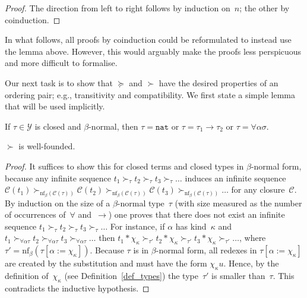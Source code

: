 \documentclass[a4paper,UKenglish,cleveref,autoref,numberwithinsect]{lipics-v2019}
\theoremstyle{definition}
\newcommand{\ITypes}{\mathcal{Y}}
\newcommand{\arrtype}{\rightarrow}
\newcommand{\tapp}[2]{#1 * #2}
\newcommand{\subst}[2]{#1:=#2}
\newcommand{\nat}{\mathtt{nat}}
\newcommand{\cl}{\mathcal{C}}
\newcommand{\nf}{\mathrm{nf}}
\begin{document}
\begin{proof}
  The direction from left to right follows by induction on~$n$; the
  other by coinduction.
\end{proof}

In what follows, all proofs by coinduction could be reformulated to
instead use the lemma above. However, this would arguably make the
proofs less perspicuous and more difficult to formalise.

Our next task is to show that $\succeq$ and $\succ$ have the
desired properties of an ordering pair; e.g., transitivity and
compatibility. We first state a simple lemma that will be used
implicitly.

\begin{lemma}
  If $\tau \in \ITypes$ is closed and $\beta$-normal, then
  $\tau = \nat$ or $\tau = \tau_1\arrtype\tau_2$ or
  $\tau = \forall\alpha\sigma$.
\end{lemma}


\begin{lemma}\label{lem_well_founded}
  $\succ$ is well-founded.
\end{lemma}

\begin{proof}
  It suffices to show this for closed terms and closed types in
  $\beta$-normal form, because any infinite sequence $t_1 \succ_\tau
  t_2 \succ_\tau t_3 \succ_\tau \ldots$ induces an infinite sequence
  $\cl(t_1) \succ_{\nf_\beta(\cl(\tau))} \cl(t_2)
  \succ_{\nf_\beta(\cl(\tau))} \cl(t_3) \succ_{\nf_\beta(\cl(\tau))}
  \ldots$ for any closure~$\cl$. By induction on the size of a
  $\beta$-normal type~$\tau$ (with size measured as the number of
  occurrences of~$\forall$ and~$\arrtype$) one proves that there does
  not exist an infinite sequence $t_1 \succ_\tau t_2 \succ_\tau t_3
  \succ_\tau \ldots$ For instance, if $\alpha$ has kind~$\kappa$ and
  $t_1 \succ_{\forall\alpha\tau} t_2 \succ_{\forall\alpha\tau} t_3
  \succ_{\forall\alpha\tau} \ldots$ then $\tapp{t_1}{\chi_\kappa}
  \succ_{\tau'} \tapp{t_2}{\chi_\kappa} \succ_{\tau'}
  \tapp{t_3}{\chi_\kappa} \succ_{\tau'} \ldots$, where
  $\tau'=\nf_\beta(\tau[\subst{\alpha}{\chi_\kappa}])$. Because $\tau$
  is in $\beta$-normal form, all redexes in
  $\tau[\subst{\alpha}{\chi_\kappa}]$ are created by the substitution
  and must have the form $\chi_\kappa u$. Hence, by the definition
  of~$\chi_\kappa$ (see Definition~\ref{def_types}) the
  type~$\tau'$ is smaller than~$\tau$. This
  contradicts the inductive hypothesis.
\end{proof}
\end{document}
